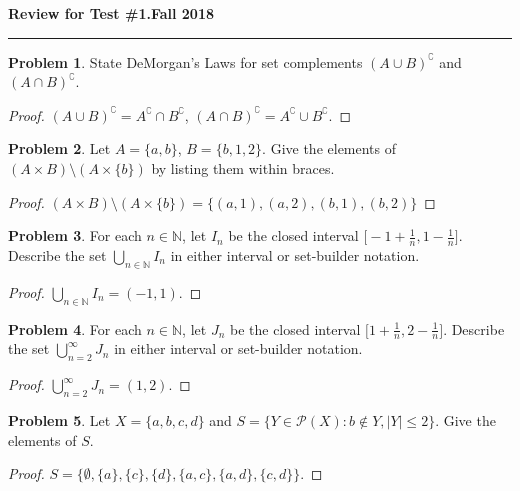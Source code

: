 \documentclass[11pt]{article}
\theoremstyle{definition}
\newtheorem{problem}{Problem}
\begin{document}
\hfill{\large\bf Review for Test \#1.}\hfill{\large\bf  Fall 2018}\hrule

\begin{problem}
  State DeMorgan's Laws for set complements $(A \cup B)^\complement$ and $(A \cap B)^\complement$.
\end{problem}
\begin{proof}
  $(A \cup B)^\complement = A^\complement \cap B^\complement$,   $(A \cap B)^\complement = A^\complement \cup B^\complement$.
\end{proof}

\begin{problem}
  Let $A=\{ a, b \}$, $B = \{ b, 1, 2 \}$.  Give the elements of $(A \times B) \setminus ( A \times \{ b \})$ by listing
  them within braces.
\end{problem}
\begin{proof}
  $(A\times B) \setminus (A\times \{b \}) = \big\{ (a,1), (a,2), (b,1), (b,2) \big\}$
\end{proof}

\begin{problem}
  For each $n \in \mathbb{N}$, let $I_n$ be the closed interval $\big[ -1+\tfrac{1}{n}, 1 - \tfrac{1}{n} \big]$.
  Describe the set $\bigcup_{n \in \mathbb{N}} I_n$ in either interval or set-builder notation.
\end{problem}
\begin{proof}
  $\displaystyle{\bigcup_{n \in \mathbb{N}} I_n = (-1,1)}$.
\end{proof}

\begin{problem}
  For each $n \in \mathbb{N}$, let $J_n$ be the closed interval $\big[ 1+\tfrac{1}{n}, 2 - \tfrac{1}{n} \big]$.
  Describe the set $\bigcup_{n=2}^\infty J_n$ in either interval or set-builder notation.
\end{problem}
\begin{proof}
  $\displaystyle{\bigcup_{n=2}^\infty J_n = (1,2)}$.
\end{proof}

\begin{problem}
  Let $X=\{ a, b, c, d\}$ and $S = \big\{ Y \in \mathscr{P}(X) : b \not\in Y, \lvert Y \rvert \leq 2 \big\}$.  Give the
  elements of $S$.
\end{problem}
\begin{proof}
  $S = \big\{ \emptyset, \{ a \}, \{ c \}, \{ d \}, \{ a,c \}, \{ a, d \}, \{ c, d \} \big\}$.
\end{proof}
\end{document}
